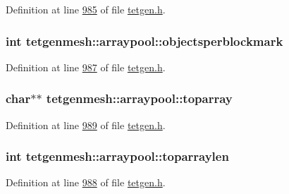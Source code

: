 Definition at line \hyperlink{tetgen_8h_source_l00985}{985} of file \hyperlink{tetgen_8h_source}{tetgen.\+h}.

\subsubsection[{\texorpdfstring{objectsperblockmark}{objectsperblockmark}}]{\setlength{\rightskip}{0pt plus 5cm}int tetgenmesh\+::arraypool\+::objectsperblockmark}\hypertarget{classtetgenmesh_1_1arraypool_a662031b2a9978bfc3be39ce90bd3bf0a}{}\label{classtetgenmesh_1_1arraypool_a662031b2a9978bfc3be39ce90bd3bf0a}


Definition at line \hyperlink{tetgen_8h_source_l00987}{987} of file \hyperlink{tetgen_8h_source}{tetgen.\+h}.

\subsubsection[{\texorpdfstring{toparray}{toparray}}]{\setlength{\rightskip}{0pt plus 5cm}char$\ast$$\ast$ tetgenmesh\+::arraypool\+::toparray}\hypertarget{classtetgenmesh_1_1arraypool_a3a4e28a88226f1dd777773fe45094650}{}\label{classtetgenmesh_1_1arraypool_a3a4e28a88226f1dd777773fe45094650}


Definition at line \hyperlink{tetgen_8h_source_l00989}{989} of file \hyperlink{tetgen_8h_source}{tetgen.\+h}.

\subsubsection[{\texorpdfstring{toparraylen}{toparraylen}}]{\setlength{\rightskip}{0pt plus 5cm}int tetgenmesh\+::arraypool\+::toparraylen}\hypertarget{classtetgenmesh_1_1arraypool_aa9ced327d45678f31b4e7f8e75aff861}{}\label{classtetgenmesh_1_1arraypool_aa9ced327d45678f31b4e7f8e75aff861}


Definition at line \hyperlink{tetgen_8h_source_l00988}{988} of file \hyperlink{tetgen_8h_source}{tetgen.\+h}.

